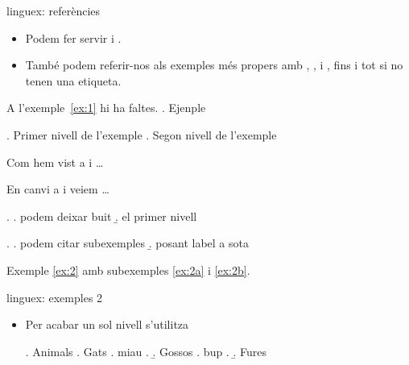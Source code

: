 \begin{frame}[fragile]{linguex: referències}
\begin{itemize}
\item Podem fer servir  i .
\item També podem referir-nos als exemples més propers amb , ,  i , fins i tot si no tenen una etiqueta.
\end{itemize}
\begin{exampletwouptiny2}
A l'exemple~\ref{ex:1} hi ha faltes.
\ex. Ejenple
\label{ex:1}

\ex. Primer nivell de l'exemple
\a. Segon nivell de l'exemple

Com hem vist a \LLast i \Last \dots

En canvi a \Next i \NNext veiem \dots

\ex.
\a. podem deixar buit
\b. el primer nivell

\ex.
\label{ex:2}
\a. podem citar subexemples
\label{ex:2a}
\b. posant label a sota
\label{ex:2b}

Exemple \ref{ex:2} amb subexemples
\ref{ex:2a} i \ref{ex:2b}.

\end{exampletwouptiny2}
\end{frame}

\begin{frame}[fragile]{linguex: exemples 2}
\begin{itemize}
\item Per acabar un sol nivell s'utilitza 
\begin{exampletwouptiny2}
\ex. Animals
\a. Gats
\a. miau
\z.
\b. Gossos
\a. bup
\z.
\b. Fures

\end{exampletwouptiny2}
\end{itemize}

\end{frame}

